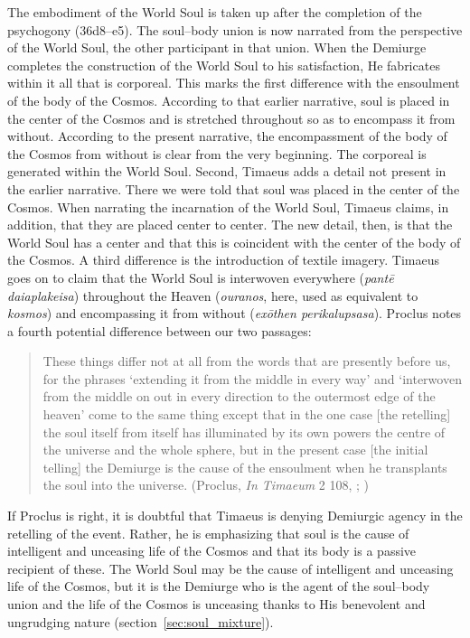 The embodiment of the World Soul is taken up after the completion of the psychogony (36d8–e5). The soul--body union is now narrated from the perspective of the World Soul, the other participant in that union. When the Demiurge completes the construction of the World Soul to his satisfaction, He fabricates within it all that is corporeal. This marks the first difference with the ensoulment of the body of the Cosmos. According to that earlier narrative, soul is placed in the center of the Cosmos and is stretched throughout so as to encompass it from without. According to the present narrative, the encompassment of the body of the Cosmos from without is clear from the very beginning. The corporeal is generated within the World Soul. Second, Timaeus adds a detail not present in the earlier narrative. There we were told that soul was placed in the center of the Cosmos. When narrating the incarnation of the World Soul, Timaeus claims, in addition, that they are placed center to center. The new detail, then, is that the World Soul has a center and that this is coincident with the center of the body of the Cosmos. A third difference is the introduction of textile imagery. Timaeus goes on to claim that the World Soul is interwoven everywhere (\emph{pantē daiaplakeisa}) throughout the Heaven (\emph{ouranos}, here, used as equivalent to \emph{kosmos}) and encompassing it from without (\emph{exōthen perikalupsasa}). Proclus notes a fourth potential difference between our two passages:
\begin{quote}
	These things differ not at all from the words that are presently before us, for the phrases `extending it from the middle in every way' and `interwoven from the middle on out in every direction to the outermost edge of the heaven' come to the same thing except that in the one case [the retelling] the soul itself from itself has illuminated by its own powers the centre of the universe and the whole sphere, but in the present case [the initial telling] the Demiurge is the cause of the ensoulment when he transplants the soul into the universe. (Proclus, \emph{In Timaeum} 2 108, \citealt{Diehl:1903re}; \citealt[64]{Baltzly:2009bc})
\end{quote}
If Proclus is right, it is doubtful that Timaeus is denying Demiurgic agency in the retelling of the event. Rather, he is emphasizing that soul is the cause of intelligent and unceasing life of the Cosmos and that its body is a passive recipient of these. The World Soul may be the cause of intelligent and unceasing life of the Cosmos, but it is the Demiurge who is the agent of the soul--body union and the life of the Cosmos is unceasing thanks to His benevolent and ungrudging nature (section~\ref{sec:soul_mixture}).

